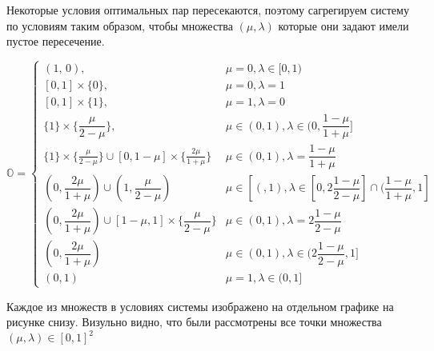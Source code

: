 Некоторые условия оптимальных пар пересекаются, поэтому 
сагрегируем систему по условиям таким образом, чтобы
множества $(\mu, \lambda)$ которые они задают имели
пустое пересечение.

$\mathbb{O} =
\begin{cases}
	(1, \, 0), & \mu = 0, \lambda \in [0, 1) 
	\\
	[0, 1] \times \{0\}, & 
	\mu=0, \lambda =1
	\\
	[0, 1] \times \{1\}, &
	\mu = 1, \lambda = 0
	\\
	\{1\} \times \{\dfrac{\mu}{2-\mu}\}, &
	\mu \in (0,1), \lambda \in (0, \dfrac{1 - \mu}{1 + \mu}]
	\\
	\{1\} \times \{\frac{\mu}{2-\mu}\} \cup
	[0,1-\mu] \times \{\frac{2\mu}{1+\mu}\} &
	\mu \in (0,1), \lambda = \dfrac{1-\mu}{1+\mu}
	\\
	(0, \dfrac{2\mu}{1 + \mu}) \cup
	(1, \dfrac{\mu}{2 - \mu}) &
	\mu \in [(, 1), \lambda \in 
	[0, 2\dfrac{1 - \mu}{2 - \mu}] \cap (\dfrac{1 - \mu}{1 + \mu}, 	1]
	\\
	(0, \dfrac{2\mu}{1+\mu}) \cup
	[1 - \mu, 1] \times \{\dfrac{\mu}{2 - \mu}\} &
	\mu \in (0, 1), \lambda = 2\dfrac{1 - \mu}{2 - \mu}
	\\
	(0, \dfrac{2\mu}{1 + \mu}) &
	\mu \in (0, 1), \lambda \in (2\dfrac{1 - \mu}{2 - \mu}, 1]
	\\
	(0, 1) & \mu = 1, \lambda \in (0, 1] 
\end{cases}
$

Каждое из множеств в условиях системы изображено на отдельном графике
на рисунке снизу. Визульно видно, что были рассмотрены все точки
множества $(\mu, \lambda) \in [0,1]^2$

